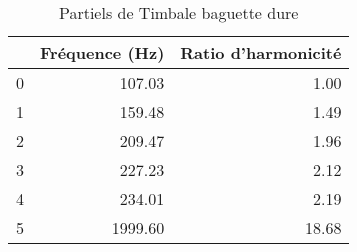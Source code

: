 \begin{table}
\centering
\caption{Partiels de Timbale baguette dure}
\label{table:partiels-timbale-hard.wav}
\begin{tabular}{lrr}
\toprule
{} &  Fréquence (Hz) &  Ratio d'harmonicité \\
\midrule
0 &          107.03 &                 1.00 \\
1 &          159.48 &                 1.49 \\
2 &          209.47 &                 1.96 \\
3 &          227.23 &                 2.12 \\
4 &          234.01 &                 2.19 \\
5 &         1999.60 &                18.68 \\
\bottomrule
\end{tabular}
\end{table}

